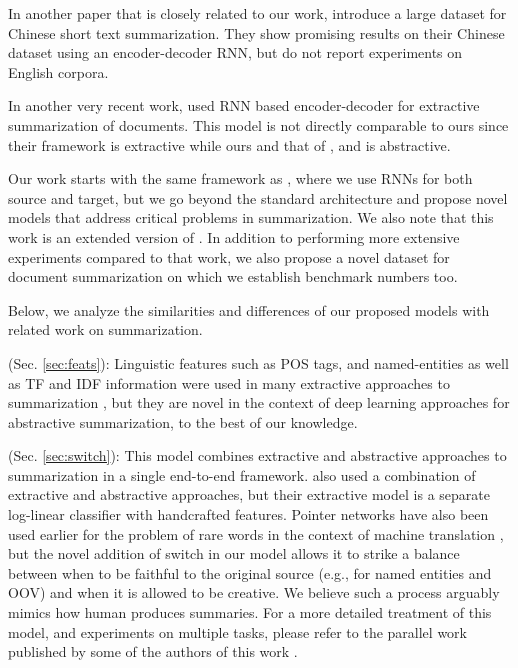 \documentclass[11pt]{article}
\begin{document}
In another paper that is closely related to our work,  introduce a large dataset for Chinese short text summarization. They show promising results on their Chinese dataset using an encoder-decoder RNN, but do not report experiments on English corpora. 

In another very recent work,  used RNN based encoder-decoder for extractive summarization of documents. This model is not directly comparable to ours since their framework is extractive while ours and that of \cite{namas}, \cite{hu:2015:EMNLP} and \cite{chopra} is abstractive.

Our work starts with the same framework as \cite{hu:2015:EMNLP}, where we use RNNs for both source and target, but we go beyond the standard architecture and propose novel models that address critical problems in summarization. We also note that this work is an extended version of . In addition to performing more extensive experiments compared to that work, we also propose a novel dataset for document summarization on which we establish benchmark numbers too.

Below, we analyze the similarities and differences of our proposed models with related work on summarization.

 (Sec. \ref{sec:feats}): Linguistic features such as POS tags, and named-entities as well as TF and IDF information were used in many extractive approaches to summarization \cite{linguistic_extractive}, but they are novel in the context of deep learning approaches for abstractive summarization, to the best of our knowledge.

 (Sec. \ref{sec:switch}): This model combines extractive and abstractive approaches to summarization in a single end-to-end framework.  also used a combination of extractive and abstractive approaches, but their extractive model is a separate log-linear classifier with handcrafted features. Pointer networks \cite{pointer_networks} have also been used earlier for the problem of rare words in the context of machine translation \cite{luongACL15}, but the novel addition of switch in our model allows it to strike a balance between when to be faithful to the original source (e.g., for named entities and OOV) and when it is allowed to be creative. We believe such a process arguably mimics how human produces summaries. For a more detailed treatment of this model, and experiments on multiple tasks, please refer to the parallel work published by some of the authors of this work \cite{caglar_acl}.
\end{document}
